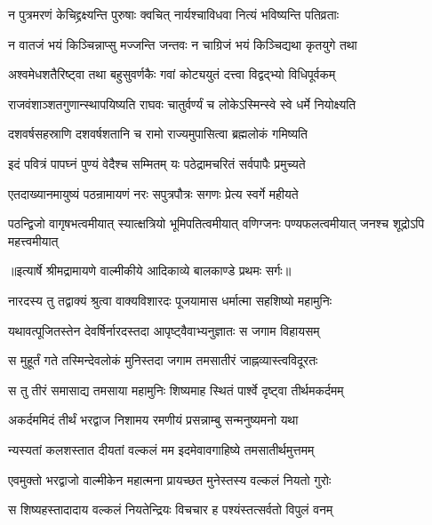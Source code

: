 \twolineshloka
{न पुत्रमरणं केचिद्द्रक्ष्यन्ति पुरुषाः क्वचित्}
{नार्यश्चाविधवा नित्यं भविष्यन्ति पतिव्रताः} %

\twolineshloka
{न वातजं भयं किञ्चिन्नाप्सु मज्जन्ति जन्तवः}
{न चाग्रिजं भयं किञ्चिद्यथा कृतयुगे तथा} %

\twolineshloka
{अश्वमेधशतैरिष्ट्वा तथा बहुसुवर्णकैः}
{गवां कोट्ययुतं दत्त्वा विद्वद्भ्यो विधिपूर्वकम्} %

\twolineshloka
{राजवंशाञ्शतगुणान्स्थापयिष्यति राघवः}
{चातुर्वर्ण्यं च लोकेऽस्मिन्स्वे स्वे धर्मे नियोक्ष्यति} %

\twolineshloka
{दशवर्षसहस्राणि दशवर्षशतानि च}
{रामो राज्यमुपासित्वा ब्रह्मलोकं गमिष्यति} %

\twolineshloka
{इदं पवित्रं पापघ्नं पुण्यं वेदैश्च सम्मितम्}
{यः पठेद्रामचरितं सर्वपापैः प्रमुच्यते} %

\twolineshloka
{एतदाख्यानमायुष्यं पठन्रामायणं नरः}
{सपुत्रपौत्रः सगणः प्रेत्य स्वर्गे महीयते} %

\fourlineindentedshloka
{पठन्द्विजो वागृषभत्वमीयात्}
{स्यात्क्षत्रियो भूमिपतित्वमीयात्}
{वणिग्जनः पण्यफलत्वमीयात्}
{जनश्च शूद्रोऽपि महत्त्वमीयात्} %


{॥इत्यार्षे श्रीमद्रामायणे वाल्मीकीये आदिकाव्ये बालकाण्डे प्रथमः सर्गः॥}


\twolineshloka
{नारदस्य तु तद्वाक्यं श्रुत्वा वाक्यविशारदः}
{पूजयामास धर्मात्मा सहशिष्यो महामुनिः} %

\twolineshloka
{यथावत्पूजितस्तेन देवर्षिर्नारदस्तदा}
{आपृष्ट्वैवाभ्यनुज्ञातः स जगाम विहायसम्} %

\twolineshloka
{स मुहूर्तं गते तस्मिन्देवलोकं मुनिस्तदा}
{जगाम तमसातीरं जाह्नव्यास्त्वविदूरतः} %

\twolineshloka
{स तु तीरं समासाद्य तमसाया महामुनिः}
{शिष्यमाह स्थितं पार्श्वे दृष्ट्वा तीर्थमकर्दमम्} %

\twolineshloka
{अकर्दममिदं तीर्थं भरद्वाज निशामय}
{रमणीयं प्रसन्नाम्बु सन्मनुष्यमनो यथा} %

\twolineshloka
{न्यस्यतां कलशस्तात दीयतां वल्कलं मम}
{इदमेवावगाहिष्ये तमसातीर्थमुत्तमम्} %

\twolineshloka
{एवमुक्तो भरद्वाजो वाल्मीकेन महात्मना}
{प्रायच्छत मुनेस्तस्य वल्कलं नियतो गुरोः} %

\twolineshloka
{स शिष्यहस्तादादाय वल्कलं नियतेन्द्रियः}
{विचचार ह पश्यंस्तत्सर्वतो विपुलं वनम्} %

